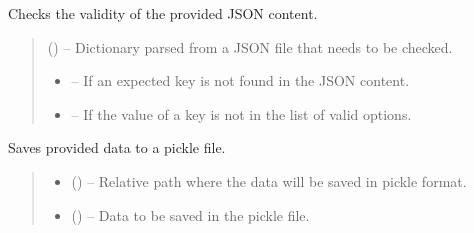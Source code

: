 \documentclass[letterpaper,10pt,english]{sphinxmanual}
\begin{document}
\begin{fulllineitems}
\label{\detokenize{fspsim.utils:fspsim.utils.SpaceCatalogue.check_json_file}}
\pysigstartsignatures
{}
\pysigstopsignatures
\sphinxAtStartPar
Checks the validity of the provided JSON content.
\begin{quote}\begin{description}
\sphinxAtStartPar
{} () – Dictionary parsed from a JSON file that needs to be checked.

\begin{itemize}
\item {} 
\sphinxAtStartPar
{} – If an expected key is not found in the JSON content.

\item {} 
\sphinxAtStartPar
{} – If the value of a key is not in the list of valid options.

\end{itemize}

\end{description}\end{quote}

\end{fulllineitems}


\begin{fulllineitems}
\label{\detokenize{fspsim.utils:fspsim.utils.SpaceCatalogue.dump_pickle}}
\pysigstartsignatures
{}
\pysigstopsignatures
\sphinxAtStartPar
Saves provided data to a pickle file.
\begin{quote}\begin{description}
\begin{itemize}
\item {} 
\sphinxAtStartPar
{} () – Relative path where the data will be saved in pickle format.

\item {} 
\sphinxAtStartPar
{} () – Data to be saved in the pickle file.

\end{itemize}

\end{description}\end{quote}

\end{fulllineitems}
\end{document}
